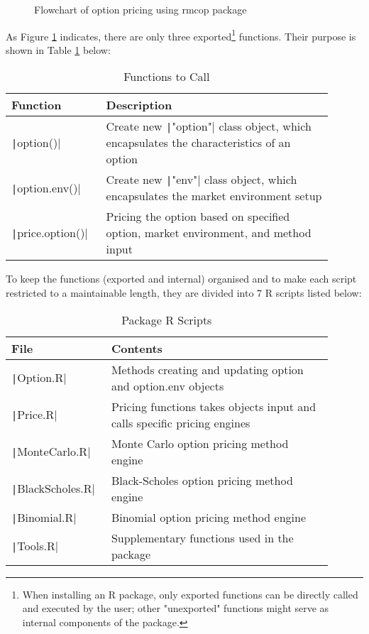 \begin{figure}[H]
    \centering
    
    \caption{Flowchart of option pricing using rmcop package} \label{img:flowchart_option}
\end{figure}

As Figure \ref{img:flowchart_option} indicates, there are only three exported\footnote{When installing an R package, only exported functions can be directly called and executed by the user; other "unexported" functions might serve as internal components of the package.} functions. Their purpose is shown in Table \ref{tab:pkg_functions} below:

\begin{table}[H]
    \begin{tabular}{p{0.25\linewidth} | p{0.65\linewidth}}
    Function                            & Description \\ \hline
    \texttt|option()|            & Create new \texttt|"option"| class object, which encapsulates the characteristics of an option \\
    \texttt|option.env()|        & Create new \texttt|"env"| class object, which encapsulates the market environment setup \\
    \texttt|price.option()|      & Pricing the option based on specified option, market environment, and method input                       
    \end{tabular}
    \caption{Functions to Call} \label{tab:pkg_functions}
\end{table}
    
To keep the functions (exported and internal) organised and to make each script restricted to a maintainable length, they are divided into 7 R scripts listed below:

\begin{table}[H]
\begin{tabular}{p{0.25\linewidth} | p{0.65\linewidth}}
File                           & Contents \\ \hline
\texttt|Option.R|       & Methods creating and updating option and option.env objects \\
\texttt|Price.R|        & Pricing functions takes objects input and calls specific pricing engines \\
\texttt|MonteCarlo.R|   & Monte Carlo option pricing method engine \\
\texttt|BlackScholes.R| & Black-Scholes option pricing method engine \\
\texttt|Binomial.R|     & Binomial option pricing method engine \\
\texttt|Tools.R|        & Supplementary functions used in the package
\end{tabular}
\caption{Package R Scripts} \label{tab:pkg_scripts}
\end{table} 


